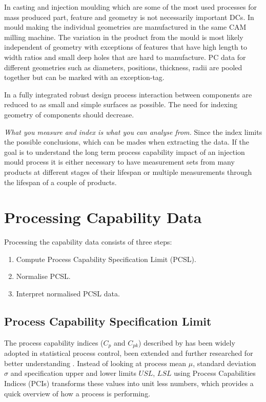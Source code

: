 \documentclass[aip,amsmath, reprint, author-year]{revtex4-1}
\begin{document}
In casting and injection moulding which are some of the most used processes for mass produced part, feature and geometry is not necessarily important DCs. In mould making the individual geometries are manufactured in the same CAM milling machine. 
The variation in the product from the mould is most likely independent of geometry with exceptions of features that have high length to width ratios and small deep holes that are hard to manufacture. PC data for different geometries such as diameters, positions, thickness, radii are pooled together but can be marked with an exception-tag.

In a fully integrated robust design process interaction between components are reduced to as small and simple surfaces as possible. The need for indexing geometry of components should decrease.

\emph{What you measure and index is what you can analyse from.}
Since the index limits the possible conclusions, which can be mades when extracting the data. If the goal is to understand the long term process capability impact of an injection mould process it is either necessary to have measurement sets from many products at different stages of their lifespan or multiple measurements through the lifespan of a couple of products.    

\section{Processing Capability Data}

Processing the capability data consists of three steps: 

\begin{enumerate}
	\item Compute Process Capability Specification Limit (PCSL).
	\item Normalise PCSL.
	\item Interpret normalised PCSL data.
\end{enumerate}

\subsection{Process Capability Specification Limit}
The process capability indices ($C_p$ and $C_{pk}$) described by \cite{kane1986process} has been widely adopted in statistical process control, been extended and further researched for better understanding \citep{wu2009overview}. 
Instead of looking at process mean $\mu$, standard deviation $\sigma$ and specification upper and lower limits $USL$, $LSL$ using Process Capabilities Indices (PCIs) transforms these values into unit less numbers, which provides a quick overview of how a process is performing.
\end{document}
